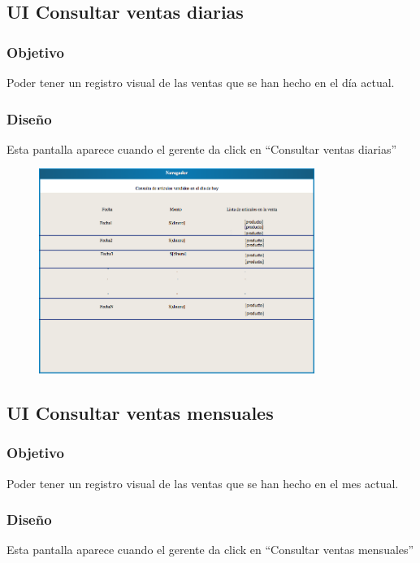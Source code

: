 \subsection{UI Consultar ventas diarias}
\subsubsection{Objetivo}
Poder tener un registro visual de las ventas que se han hecho en el día actual.
\subsubsection{Diseño}
   Esta pantalla aparece cuando el gerente da click en ``Consultar ventas diarias'' 


\begin{figure}[htbp!]
        \centering
            \includegraphics[width=0.8\textwidth]{images/consultaVentasDia}
            
            
    \end{figure}
    

\subsection{UI Consultar ventas mensuales}
\subsubsection{Objetivo}
Poder tener un registro visual de las ventas que se han hecho en el mes actual.
\subsubsection{Diseño}
   Esta pantalla aparece cuando el gerente da click en ``Consultar ventas mensuales'' 


